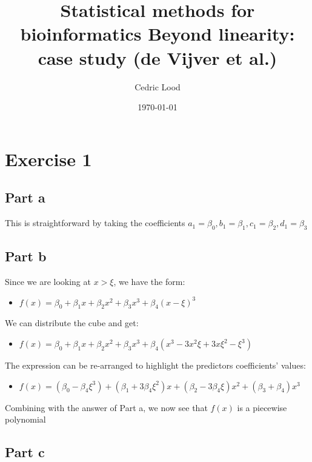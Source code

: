 \documentclass[11pt, a4paper]{article}
\title{Statistical methods for bioinformatics \linebreak Beyond linearity: case study (de Vijver et al.)}
\author{Cedric Lood}
\date{\today}
\begin{document}
\maketitle


\graphicspath{ {figures/} }
\setlength{\droptitle}{-5em} 
\setlength{\parindent}{0cm}

\section{Exercise 1}
\label{sec-1}
\subsection{Part a}
\label{sec-1-1}

This is straightforward by taking the coefficients $a_1=\beta_0,
b_1=\beta_1, c_1=\beta_2, d_1=\beta_3$
\subsection{Part b}
\label{sec-1-2}

Since we are looking at $x>\xi$, we have the form:

\begin{itemize}
\item $f(x)=\beta_0 + \beta_1 x + \beta_2 x^2 + \beta_3 x^3 + \beta_4 (x - \xi)^3$
\end{itemize}

We can distribute the cube and get:

\begin{itemize}
\item $f(x)=\beta_0 + \beta_1 x + \beta_2 x^2 + \beta_3 x^3 + \beta_4 (x^3 - 3 x^2 \xi + 3 x \xi^2 - \xi^3)$
\end{itemize}

The expression can be re-arranged to highlight the predictors
coefficients' values:
 
\begin{itemize}
\item $f(x)=(\beta_0 - \beta_4 \xi^3) + (\beta_1 + 3 \beta_4 \xi^2) x +(\beta_2 - 3 \beta_4 \xi) x^2 + (\beta_3 + \beta_4) x^3$
\end{itemize}

Combining with the answer of Part a, we now see that $f(x)$ is a
piecewise polynomial
\subsection{Part c}
\label{sec-1-3}
\end{document}
